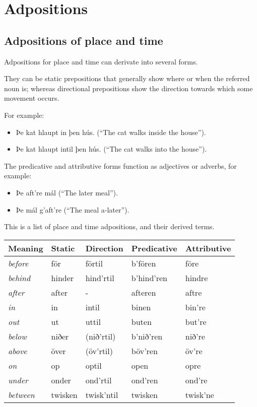 \section{Adpositions}

\subsection{Adpositions of place and time}

Adpositions for place and time can derivate into several forms.

They can be static prepositions that generally show where or when the referred
noun is; whereas directional prepositions show the direction towards which some
movement occurs.

For example:

\begin{itemize}
\item Þe kat hlaupt in þen hús. (``The cat walks inside the house'').
\item Þe kat hlaupt intil þen hús. (``The cat walks into the house'').
\end{itemize}

The predicative and attributive forms function as adjectives or adverbs, for example:

\begin{itemize}
\item Þe aft're mál (``The later meal'').
\item Þe mál g'aft're (``The meal a-later'').
\end{itemize}

This is a list of place and time adpositions, and their derived terms.

\begin{center}
\begin{tabular}{lllll}
Meaning & Static & Direction & Predicative & Attributive \\
\hline
\textit{before}  & för     & förtil     & b'fören    & före     \\
\textit{behind}  & hinder  & hind'rtil  & b'hind'ren & hindre   \\
\textit{after}   & after   & -          & afteren    & aftre    \\
\textit{in}      & in      & intil      & binen      & bin're   \\
\textit{out}     & ut      & uttil      & buten      & but're   \\
\textit{below}   & niðer   & (nið'rtil) & b'nið'ren  & nið're   \\
\textit{above}   & över    & (öv'rtil)  & böv'ren    & öv're    \\
\textit{on}      & op      & optil      & open       & opre     \\
\textit{under}   & onder   & ond'rtil   & ond'ren    & ond're   \\
\textit{between} & twisken & twisk'ntil & twisken    & twisk'ne \\
\end{tabular}
\end{center}

